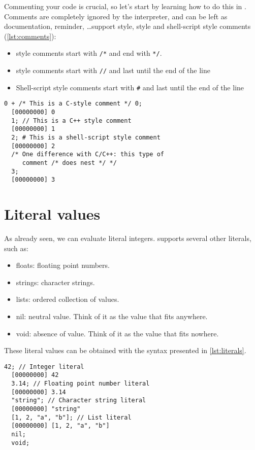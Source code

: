 \documentclass[openright,twoside,12pt]{report}
\newcommand{\lst}[1]{\autoref{lst:#1}}
\begin{document}
Commenting your code is crucial, so let's start by learning how to do
this in \urbi. Comments are completely ignored by the interpreter, and
can be left as documentation, reminder, \ldots \urbi support \C style,
\Cxx style and shell-script style comments (\lst{comments}):

\begin{itemize}
\item \C style comments start with \texttt{/*} and end with \texttt{*/}.
\item \Cxx style comments start with \texttt{//} and last until the
  end of the line
\item Shell-script style comments start with \texttt{\#} and last
  until the end of the line
\end{itemize}


\begin{lstlisting}[caption=Comments in \urbi, label=lst:comments]
  0 + /* This is a C-style comment */ 0;
  [00000000] 0
  1; // This is a C++ style comment
  [00000000] 1
  2; # This is a shell-script style comment
  [00000000] 2
  /* One difference with C/C++: this type of
     comment /* does nest */ */
  3;
  [00000000] 3
\end{lstlisting}


\section{Literal values}

As already seen, we can evaluate literal integers. \urbi supports
several other literals, such as:

\begin{itemize}
\item floats: floating point numbers.
\item strings: character strings.
\item lists: ordered collection of values.
\item nil: neutral value. Think of it as the value that fits anywhere.
\item void: absence of value. Think of it as the value that fits nowhere.
\end{itemize}

These literal values can be obtained with the syntax presented in
\lst{literals}.

\begin{lstlisting}[caption=Literals,label=lst:literals]
  42; // Integer literal
  [00000000] 42
  3.14; // Floating point number literal
  [00000000] 3.14
  "string"; // Character string literal
  [00000000] "string"
  [1, 2, "a", "b"]; // List literal
  [00000000] [1, 2, "a", "b"]
  nil;
  void;
\end{lstlisting}
\end{document}
